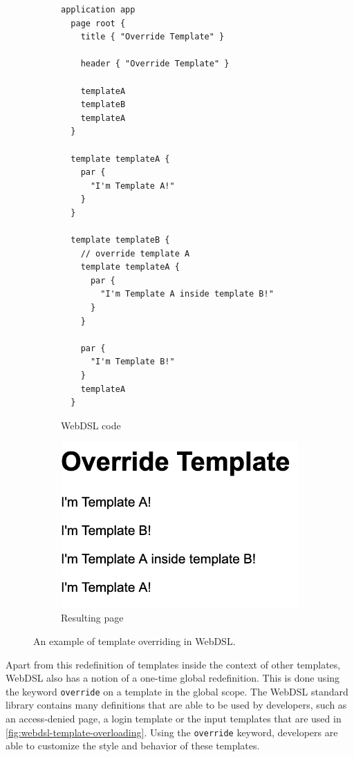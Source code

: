       \begin{figure}
        \begin{subfigure}[t]{0.45\textwidth}
          \begin{verbatim}
application app
  page root {
    title { "Override Template" }

    header { "Override Template" }

    templateA
    templateB
    templateA
  }

  template templateA {
    par {
      "I'm Template A!"
    }
  }

  template templateB {
    // override template A
    template templateA {
      par {
        "I'm Template A inside template B!"
      }
    }

    par {
      "I'm Template B!"
    }
    templateA
  }
          \end{verbatim}
          \caption{\label{fig:webdsl-template-overriding-webdsl}WebDSL code}
        \end{subfigure}
        \begin{subfigure}[t]{0.55\textwidth}
          \capstart
          \includegraphics[width=\textwidth]{../img/webdsl-template-overriding}
          \caption{\label{fig:webdsl-template-overriding-page}Resulting page}
        \end{subfigure}
      \caption{\label{fig:webdsl-template-overriding}An example of template overriding in WebDSL.}
      \end{figure}

      Apart from this redefinition of templates inside the context of other templates, WebDSL also has a notion of a one-time global redefinition. This is done using the keyword \texttt{override} on a template in the global scope. The WebDSL standard library contains many definitions that are able to be used by developers, such as an access-denied page, a login template or the input templates that are used in \cref{fig:webdsl-template-overloading}. Using the \texttt{override} keyword, developers are able to customize the style and behavior of these templates.

